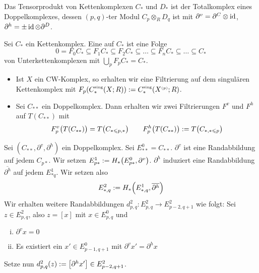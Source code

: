 \begin{beispiel}[{name=[Tensorprodukt als Totalkomplex]}]
	Das Tensorprodukt von Kettenkomplexen $C_*$ und $D_*$ ist der Totalkomplex eines Doppelkomplexes, dessen $(p,q)$-ter Modul $C_p \otimes_R D_q$ ist mit $\partial^v = \partial^C \otimes \id$, $\partial^h = \pm \id \otimes \partial^D$.
\end{beispiel}

\begin{definition}[{name=[Filtrierung]}]
	Sei $C_*$ ein Kettenkomplex. Eine  auf $C_*$ ist eine Folge 
	\[
		0 = F_0 C_* \subseteq F_1 C_*  \subseteq F_2 C_* \subseteq \ldots \subseteq F_n C_* \subseteq \ldots \subseteq C_*
	\] 
	von  Unterkettenkomplexen mit $\bigcup_{p} F_p C_* = C_*$.
\end{definition}

\begin{beispiel}[{name=[Filtrierungen]}]
	\leavevmode
	\begin{itemize}
		\item Ist $X$ ein CW-Komplex, so erhalten wir eine Filtrierung auf dem singulären Kettenkomplex mit $F_p \enbrace*{C^\sing_*(X;R)} := C_*^\sing \enbrace*{X^\ssbrace{p};R}$.
		\item Sei $C_{**}$ ein Doppelkomplex. 
		Dann erhalten wir zwei Filtrierungen $F^v$ und $F^h$ auf $T(C_{**})$ mit 
		\[
			F^v_p \enbrace[\big]{T(C_{**})} = T \enbrace[\big]{C_{*\le p,*}} \qquad F^h_p \enbrace[\big]{T(C_{**})} := T \enbrace[\big]{C_{*,*\le p}}
		\]
	\end{itemize}
\end{beispiel}

\begin{bemerkung}
	Sei $(C_{**},\partial^v,\partial^h)$ ein Doppelkomplex.
	Sei $E^0_{**}= C_{**}$.
	$\partial^v$ ist eine Randabbildung auf jedem $C_{p*}$.
	Wir setzen $E^1_{p*} := H_*\enbrace*{E^0_{p*},\partial^v}$.
	$\partial^h$ induziert eine Randabbildung $\overline{\partial^h}$ auf jedem $E^1_{*q}$. Wir setzen also
	\[
		E^2_{*,q} := H_* \enbrace*{E^1_{*,q},\overline{\partial^h}}
	\]
	Wir erhalten weitere Randabbildungen $d^2_{p,q} \colon E^2_{p,q} \to E^2_{p-2,q+1}$ wie folgt: Sei $z \in E^2_{p,q}$, also $z=[x]$ mit $x \in E^0_{p,q}$ und 
	\begin{enumerate}[(i),itemsep=0pt]
		\item $\partial^v x =0$
		\item Es existiert ein $x' \in E^0_{p-1,q+1}$ mit $\partial^v x' = \partial^h x$
	\end{enumerate}
	Setze nun $d^2_{p,q}(z) := \benbrace*{\partial^h x'} \in E^2_{p-2,q+1}$.
\end{bemerkung}
\newpage

